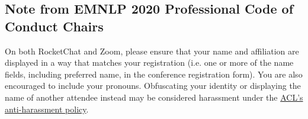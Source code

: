 \documentclass[11pt]{scrartcl}
\newcommand{\conferenceName}{EMNLP 2020\xspace}
\begin{document}
\subsection*{Note from \conferenceName Professional Code of Conduct Chairs}

On both RocketChat and Zoom, please ensure that your name and affiliation are displayed in a way that matches your registration (i.e. one or more of the name fields, including preferred name, in the conference registration form). You are also encouraged to include your pronouns. Obfuscating your identity or displaying the name of another attendee instead may be considered harassment under the \href{https://www.aclweb.org/adminwiki/index.php?title=Anti-Harassment_Policy}{ACL's anti-harassment policy}.
\end{document}
